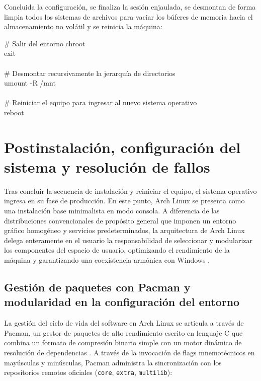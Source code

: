 \documentclass[12pt]{article}
\begin{document}
Concluida la configuración, se finaliza la sesión enjaulada, se desmontan de forma limpia todos los sistemas de archivos para vaciar los búferes de memoria hacia el almacenamiento no volátil y se reinicia la máquina:

\begin{mdframed}[style=terminal]
\ttfamily\upshape\color{bashLetterColor}\footnotesize
\# Salir del entorno chroot \\
exit \\
\\
\# Desmontar recursivamente la jerarquía de directorios \\
umount -R /mnt \\
\\
\# Reiniciar el equipo para ingresar al nuevo sistema operativo \\
reboot
\end{mdframed}

\section{Postinstalación, configuración del sistema y resolución de fallos}
\label{sec:postinstalacionConfiguracion}

Tras concluir la secuencia de instalación y reiniciar el equipo, el sistema operativo ingresa en su fase de producción. En este punto, Arch Linux se presenta como una instalación base minimalista en modo consola. A diferencia de las distribuciones convencionales de propósito general que imponen un entorno gráfico homogéneo y servicios predeterminados, la arquitectura de Arch Linux delega enteramente en el usuario la responsabilidad de seleccionar y modularizar los componentes del espacio de usuario, optimizando el rendimiento de la máquina y garantizando una coexistencia armónica con Windows \parencite{arch2024install}.

\subsection{Gestión de paquetes con Pacman y modularidad en la configuración del entorno}
\label{sec:gestionPaquetesModularidad}

La gestión del ciclo de vida del software en Arch Linux se articula a través de Pacman, un gestor de paquetes de alto rendimiento escrito en lenguaje C que combina un formato de compresión binario simple con un motor dinámico de resolución de dependencias \parencite{arch2024install}. A través de la invocación de flags mnemotécnicos en mayúsculas y minúsculas, Pacman administra la sincronización con los repositorios remotos oficiales (\texttt{core}, \texttt{extra}, \texttt{multilib}):
\end{document}
